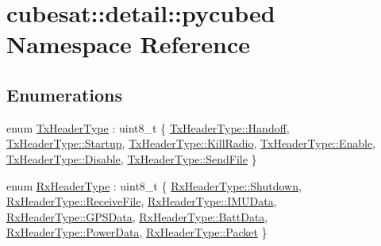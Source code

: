 \hypertarget{namespacecubesat_1_1detail_1_1pycubed}{}\section{cubesat\+:\+:detail\+:\+:pycubed Namespace Reference}
\label{namespacecubesat_1_1detail_1_1pycubed}
\subsection*{Enumerations}
\begin{DoxyCompactItemize}
\item 
enum \hyperlink{namespacecubesat_1_1detail_1_1pycubed_ae3a329ec6cfe8cb9632e55f2e37e544b}{Tx\+Header\+Type} \+: uint8\+\_\+t \{ \newline
\hyperlink{namespacecubesat_1_1detail_1_1pycubed_ae3a329ec6cfe8cb9632e55f2e37e544baffb809994df57f1360313c7b5599610c}{Tx\+Header\+Type\+::\+Handoff}, 
\hyperlink{namespacecubesat_1_1detail_1_1pycubed_ae3a329ec6cfe8cb9632e55f2e37e544ba13e685964c2548aa748f7ea263bad4e5}{Tx\+Header\+Type\+::\+Startup}, 
\hyperlink{namespacecubesat_1_1detail_1_1pycubed_ae3a329ec6cfe8cb9632e55f2e37e544bab36026da8fbd9864b7602687aa7400bc}{Tx\+Header\+Type\+::\+Kill\+Radio}, 
\hyperlink{namespacecubesat_1_1detail_1_1pycubed_ae3a329ec6cfe8cb9632e55f2e37e544ba2faec1f9f8cc7f8f40d521c4dd574f49}{Tx\+Header\+Type\+::\+Enable}, 
\newline
\hyperlink{namespacecubesat_1_1detail_1_1pycubed_ae3a329ec6cfe8cb9632e55f2e37e544babcfaccebf745acfd5e75351095a5394a}{Tx\+Header\+Type\+::\+Disable}, 
\hyperlink{namespacecubesat_1_1detail_1_1pycubed_ae3a329ec6cfe8cb9632e55f2e37e544ba9711c6642640926ac61cd85ad1cd9aab}{Tx\+Header\+Type\+::\+Send\+File}
 \}
\item 
enum \hyperlink{namespacecubesat_1_1detail_1_1pycubed_ab2720e13c4f3c6e994f714861a6cdc09}{Rx\+Header\+Type} \+: uint8\+\_\+t \{ \newline
\hyperlink{namespacecubesat_1_1detail_1_1pycubed_ab2720e13c4f3c6e994f714861a6cdc09a1a4ebb180ba59b067782515ffee6e975}{Rx\+Header\+Type\+::\+Shutdown}, 
\hyperlink{namespacecubesat_1_1detail_1_1pycubed_ab2720e13c4f3c6e994f714861a6cdc09a7f83039697470022caddaac96e857217}{Rx\+Header\+Type\+::\+Receive\+File}, 
\hyperlink{namespacecubesat_1_1detail_1_1pycubed_ab2720e13c4f3c6e994f714861a6cdc09ac4badb5fe05d0d8b5f9316b8401a194f}{Rx\+Header\+Type\+::\+I\+M\+U\+Data}, 
\hyperlink{namespacecubesat_1_1detail_1_1pycubed_ab2720e13c4f3c6e994f714861a6cdc09a717f74dffe582702dcb8eab15920b379}{Rx\+Header\+Type\+::\+G\+P\+S\+Data}, 
\newline
\hyperlink{namespacecubesat_1_1detail_1_1pycubed_ab2720e13c4f3c6e994f714861a6cdc09adfb51999537cf23336abe38ca2c12f14}{Rx\+Header\+Type\+::\+Batt\+Data}, 
\hyperlink{namespacecubesat_1_1detail_1_1pycubed_ab2720e13c4f3c6e994f714861a6cdc09a85ef20040ab4a17a1908d5575c2a1f0d}{Rx\+Header\+Type\+::\+Power\+Data}, 
\hyperlink{namespacecubesat_1_1detail_1_1pycubed_ab2720e13c4f3c6e994f714861a6cdc09af39181116a0042e3b50710c2a1e70f74}{Rx\+Header\+Type\+::\+Packet}
 \}
\end{DoxyCompactItemize}


